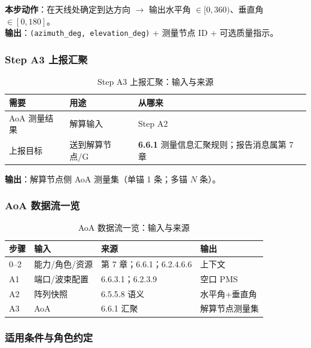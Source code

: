 \documentclass[11pt,a4paper]{ctexart}
\begin{document}
\textbf{本步动作}：在天线处确定到达方向 $\rightarrow$ 输出水平角 $\in[0,360)$、垂直角 $\in[0,180]$。\\
\textbf{输出}：\texttt{(azimuth\_deg, elevation\_deg)} + 测量节点 ID + 可选质量指示。

\subsubsection{Step A3 上报汇聚}

\begin{longtable}{L{3.2cm}L{5.0cm}L{4.8cm}}
\caption{Step A3 上报汇聚：输入与来源\label{tab:step116}} \\
\toprule
\textbf{需要} & \textbf{用途} & \textbf{从哪来} \\
\midrule
AoA 测量结果 & 解算输入 & Step A2 \\
上报目标 & 送到解算节点/G & \textbf{6.6.1} 测量信息汇聚规则；报告消息属第 7 章 \\
\bottomrule
\end{longtable}

\textbf{输出}：解算节点侧 AoA 测量集（单锚 1 条；多锚 $N$ 条）。

\subsubsection{AoA 数据流一览}

\begin{longtable}{llll}
\caption{AoA 数据流一览：输入与来源\label{tab:step117}} \\
\toprule
\textbf{步骤} & \textbf{输入} & \textbf{来源} & \textbf{输出} \\
\midrule
0--2 & 能力/角色/资源 & 第 7 章；6.6.1；6.2.4.6.6 & 上下文 \\
A1 & 端口/波束配置 & 6.6.3.1；6.2.3.9 & 空口 PMS \\
A2 & 阵列快照 & 6.5.5.8 语义 & 水平角+垂直角 \\
A3 & AoA & 6.6.1 汇聚 & 解算节点测量集 \\
\bottomrule
\end{longtable}


\label{sec:aod}

\subsubsection{适用条件与角色约定}
\end{document}
